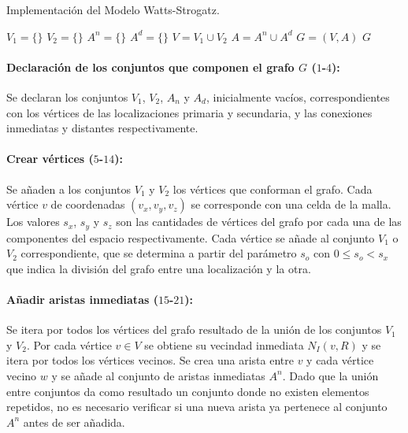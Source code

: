 \begin{algorithm}[!ht]
\caption{Implementaci\'on del Modelo Watts-Strogatz.} \label{alg-watts}
$V_1=\lbrace \rbrace$\;
$V_2=\lbrace \rbrace$\;
$A^n=\lbrace \rbrace$\;
$A^d=\lbrace \rbrace$\;
$V=V_1 \cup V_2$\;
$A=A^n \cup A^d$\;
$G=(V,A)$\;
\Return $G$\;
\end{algorithm}

\paragraph{Declaraci\'on de los conjuntos que componen el grafo $G$ ($1$-$4$):} Se declaran los conjuntos $V_1$, $V_2$, $A_n$ y $A_d$, inicialmente vac\'ios, correspondientes con los v\'ertices de las localizaciones primaria y secundaria, y las conexiones inmediatas y distantes respectivamente. 

\paragraph{Crear v\'ertices ($5$-$14$):} Se a\~naden a los conjuntos $V_1$ y $V_2$ los v\'ertices que conforman el grafo. Cada v\'ertice $v$ de coordenadas $(v_x,v_y, v_z)$ se corresponde con una celda de la malla. Los valores $s_x$, $s_y$ y $s_z$ son las cantidades de v\'ertices del grafo por cada una de las componentes del espacio respectivamente. Cada v\'ertice se a\~nade al conjunto $V_1$ o $V_2$ correspondiente, que se determina a partir del par\'ametro $s_o$ con $0 \leq s_o < s_x$ que indica la divisi\'on del grafo entre una localizaci\'on y la otra. 

\paragraph{A\~nadir aristas inmediatas ($15$-$21$):} Se itera por todos los v\'ertices del grafo resultado de la uni\'on de los conjuntos $V_1$ y $V_2$. Por cada v\'ertice $v \in V$ se obtiene su vecindad inmediata $N_I(v,R)$ y se itera por todos los v\'ertices vecinos. Se crea una arista entre $v$ y cada v\'ertice vecino $w$ y se a\~nade al conjunto de aristas inmediatas $A^n$. Dado que la uni\'on entre conjuntos da como resultado un conjunto donde no existen elementos repetidos, no es necesario verificar si una nueva arista ya pertenece al conjunto $A^n$ antes de ser a\~nadida.

